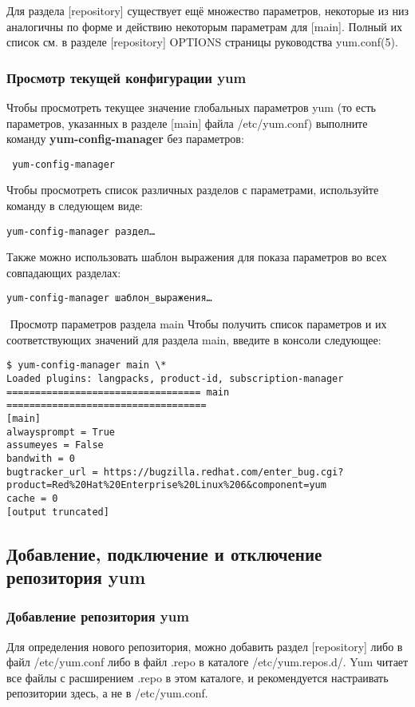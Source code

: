\documentclass[a4paper,10pt,twoside]{article}
\begin{document}
Для раздела [repository] существует ещё множество параметров, некоторые из низ аналогичны по форме и действию некоторым параметрам для [main]. Полный их список см. в разделе [repository] OPTIONS страницы руководства yum.conf(5).


\subsubsection{Просмотр текущей конфигурации yum}
Чтобы просмотреть текущее значение глобальных параметров yum (то есть параметров, указанных в разделе [main] файла /etc/yum.conf) выполните команду \textbf{yum-config-manager} без  параметров:
\begin{verbatim}
 yum-config-manager
\end{verbatim} 

Чтобы просмотреть список различных разделов с параметрами, используйте команду в следующем виде:

\begin{verbatim}
yum-config-manager раздел…
\end{verbatim} 

Также можно использовать шаблон выражения для показа параметров во всех совпадающих разделах:
\begin{verbatim}
yum-config-manager шаблон_выражения…
\end{verbatim} 
⁠
Просмотр параметров раздела main
Чтобы получить список параметров и их соответствующих значений для раздела main, введите в консоли следующее:
\begin{verbatim}
$ yum-config-manager main \*
Loaded plugins: langpacks, product-id, subscription-manager
================================== main ===================================
[main]
alwaysprompt = True
assumeyes = False
bandwith = 0
bugtracker_url = https://bugzilla.redhat.com/enter_bug.cgi?product=Red%20Hat%20Enterprise%20Linux%206&component=yum
cache = 0
[output truncated]
\end{verbatim}


\subsection{Добавление, подключение и отключение репозитория yum}


\subsubsection{Добавление репозитория yum}

Для определения нового репозитория, можно добавить раздел [repository] либо в файл /etc/yum.conf либо в файл .repo в каталоге /etc/yum.repos.d/. Yum читает все файлы с расширением .repo в этом каталоге, и рекомендуется настраивать репозитории здесь, а не в /etc/yum.conf.
\end{document}
